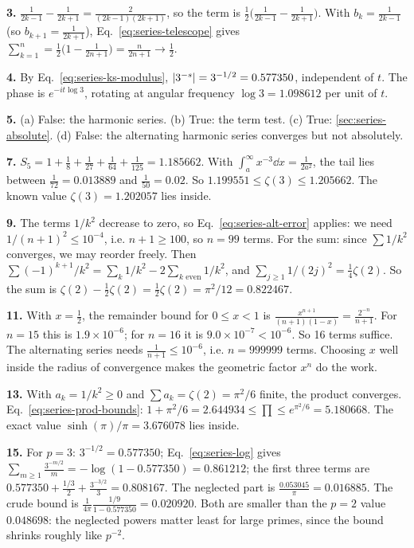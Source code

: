 \textbf{3.} $\frac1{2k-1}-\frac1{2k+1}=\frac{2}{(2k-1)(2k+1)}$, so the term is $\tfrac12\bigl(\frac1{2k-1}-\frac1{2k+1}\bigr)$. With $b_k=\frac1{2k-1}$ (so $b_{k+1}=\frac1{2k+1}$), Eq.~\eqref{eq:series-telescope} gives $\sum_{k=1}^n=\tfrac12\bigl(1-\frac1{2n+1}\bigr)=\frac{n}{2n+1}\to\tfrac12$.

\textbf{4.} By Eq.~\eqref{eq:series-ks-modulus}, $\left\lvert 3^{-s}\right\rvert=3^{-1/2}=0.577350$, independent of $t$. The phase is $e^{-it\log3}$, rotating at angular frequency $\log3=1.098612$ per unit of $t$.

\textbf{5.} (a) False: the harmonic series. (b) True: the term test. (c) True: \cref{sec:series-absolute}. (d) False: the alternating harmonic series converges but not absolutely.

\textbf{7.} $S_5=1+\tfrac18+\tfrac1{27}+\tfrac1{64}+\tfrac1{125}=1.185662$. With $\int_a^\infty x^{-3}\dd x=\frac1{2a^2}$, the tail lies between $\frac1{72}=0.013889$ and $\frac1{50}=0.02$. So $1.199551\le\zeta(3)\le1.205662$. The known value $\zeta(3)=1.202057$ lies inside.

\textbf{9.} The terms $1/k^2$ decrease to zero, so Eq.~\eqref{eq:series-alt-error} applies: we need $1/(n+1)^2\le10^{-4}$, i.e. $n+1\ge100$, so $n=99$ terms. For the sum: since $\sum1/k^2$ converges, we may reorder freely. Then $\sum(-1)^{k+1}/k^2=\sum_k1/k^2-2\sum_{k\text{ even}}1/k^2$, and $\sum_{j\ge1}1/(2j)^2=\tfrac14\zeta(2)$. So the sum is $\zeta(2)-\tfrac12\zeta(2)=\tfrac12\zeta(2)=\pi^2/12=0.822467$.

\textbf{11.} With $x=\tfrac12$, the remainder bound for $0\le x<1$ is $\frac{x^{n+1}}{(n+1)(1-x)}=\frac{2^{-n}}{n+1}$. For $n=15$ this is $1.9\times10^{-6}$; for $n=16$ it is $9.0\times10^{-7}<10^{-6}$. So 16 terms suffice. The alternating series needs $\frac1{n+1}\le10^{-6}$, i.e. $n=999999$ terms. Choosing $x$ well inside the radius of convergence makes the geometric factor $x^{n}$ do the work.

\textbf{13.} With $a_k=1/k^2\ge0$ and $\sum a_k=\zeta(2)=\pi^2/6$ finite, the product converges. Eq.~\eqref{eq:series-prod-bounds}: $1+\pi^2/6=2.644934\le\prod\le e^{\pi^2/6}=5.180668$. The exact value $\sinh(\pi)/\pi=3.676078$ lies inside.

\textbf{15.} For $p=3$: $3^{-1/2}=0.577350$; Eq.~\eqref{eq:series-log} gives $\sum_{m\ge1}\frac{3^{-m/2}}{m}=-\log(1-0.577350)=0.861212$; the first three terms are $0.577350+\frac{1/3}{2}+\frac{3^{-3/2}}{3}=0.808167$. The neglected part is $\frac{0.053045}{\pi}=0.016885$. The crude bound is $\frac{1}{4\pi}\frac{1/9}{1-0.577350}=0.020920$. Both are smaller than the $p=2$ value $0.048698$: the neglected powers matter least for large primes, since the bound shrinks roughly like $p^{-2}$.

